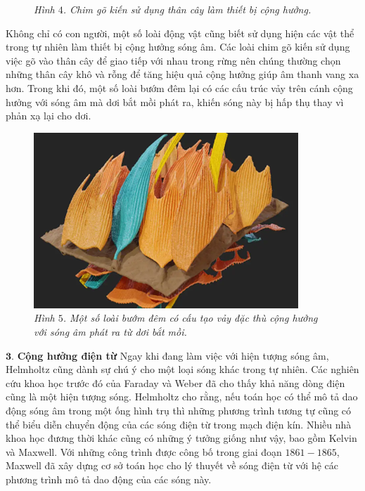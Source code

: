 \begin{multicols}{2}
\begin{figure}[H]
		\caption{\small\textit{\color{timhieukhoahoc}Hình $4$. Chim gõ kiến sử dụng thân cây làm thiết bị cộng hưởng.}}
		\vspace*{-10pt}
	\end{figure}
	Không chỉ có con người, một số loài động vật cũng biết sử dụng hiện các vật thể trong tự nhiên làm thiết bị cộng hưởng sóng âm. Các loài chim gõ kiến sử dụng việc gõ vào thân cây để giao tiếp với nhau trong rừng nên chúng thường chọn những thân cây khô và rỗng để tăng hiệu quả cộng hưởng giúp âm thanh vang xa hơn. Trong khi đó, một số loài bướm đêm lại có các cấu trúc vảy trên cánh cộng hưởng với sóng âm mà dơi bắt mồi phát ra, khiến sóng này bị hấp thụ thay vì phản xạ lại cho dơi.
	\begin{figure}[H]
		\centering
		\vspace*{-5pt}
		\captionsetup{labelformat= empty, justification=centering}
		\includegraphics[width=1\linewidth]{7}
		\caption{\small\textit{\color{timhieukhoahoc}Hình $5$. Một số loài bướm đêm có cấu tạo vảy đặc thù cộng hưởng với sóng âm phát ra từ dơi bắt mồi.}}
		\vspace*{-10pt}
	\end{figure}
	$\pmb{3.}$ \textbf{\color{timhieukhoahoc}Cộng hưởng điện từ}
	\vskip 0.1cm
	Ngay khi đang làm việc với hiện tượng sóng âm, Helmholtz cũng dành sự chú ý cho một loại sóng khác trong tự nhiên. Các nghiên cứu khoa học trước đó của Faraday và Weber đã cho thấy khả năng dòng điện cũng là một hiện tượng sóng. Helmholtz cho rằng, nếu toán học có thể mô tả dao động sóng âm trong một ống hình trụ thì những phương trình tương tự cũng có thể biểu diễn chuyển động của các sóng điện từ trong mạch điện kín. Nhiều nhà khoa học đương thời khác cũng có những ý tưởng giống như vậy, bao gồm Kelvin và Maxwell. Với những công trình được công bố trong giai đoạn $1861-1865$, Maxwell đã xây dựng cơ sở toán học cho lý thuyết về sóng điện từ với hệ các phương trình mô tả dao động của các sóng này.

\end{multicols}
